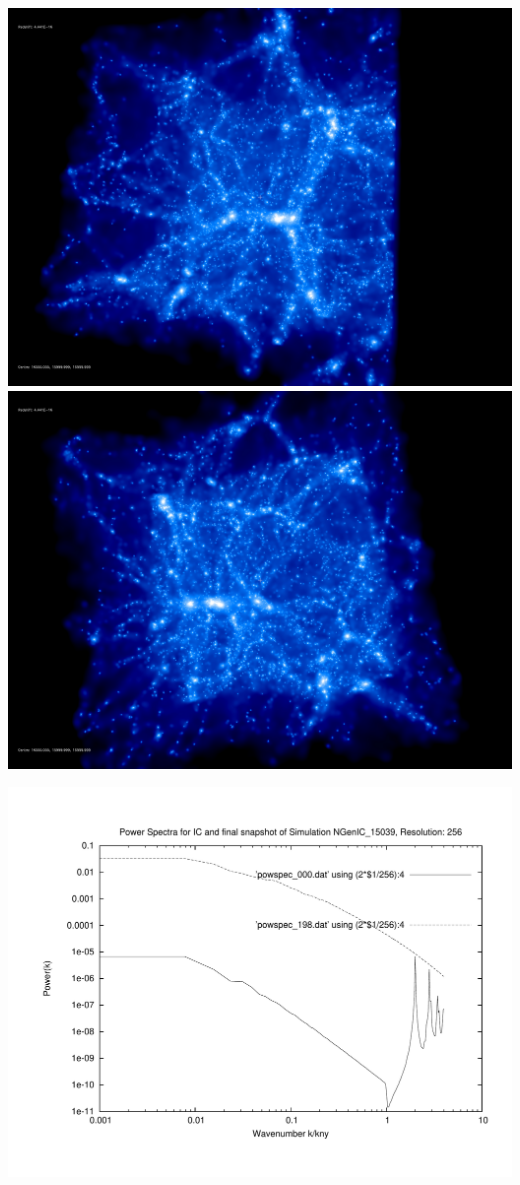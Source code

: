 \includegraphics[scale=0.1]{r256/NGenIC_15039/rotate_00074.jpg} 
\includegraphics[scale=0.1]{r256/NGenIC_15039/rotate_00131.jpg}

\includegraphics[scale=0.5]{r256/NGenIC_15039/plot_powspec_NGenIC_15039}


